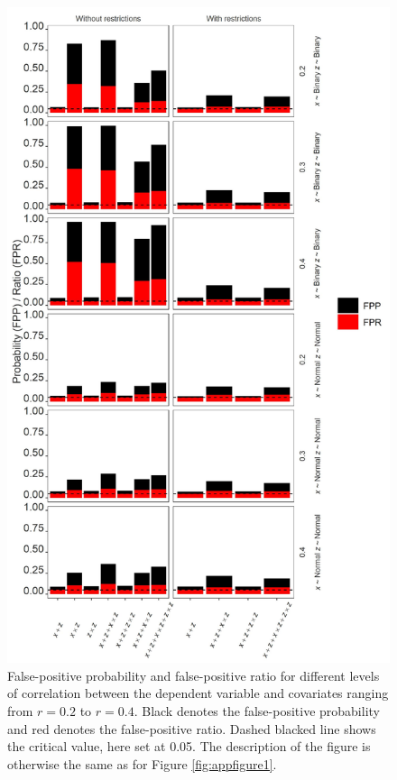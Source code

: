 \begin{landscape}
\begin{figure}[ht!]
\includegraphics[scale=0.65]{R/Analysis/Result/Figures/Figure2SI.jpeg}
\centering
\caption{False-positive probability and false-positive ratio for different levels of correlation between the dependent variable and covariates ranging from  $\textit{r}=0.2$ to  $\textit{r}=0.4$. Black denotes the false-positive probability and red denotes the false-positive ratio. Dashed blacked line shows the critical value, here set at 0.05. The description of the figure is otherwise the same as for Figure \ref{fig:appfigure1}.}
\label{fig:appfigure2}
\end{figure}
\end{landscape}


